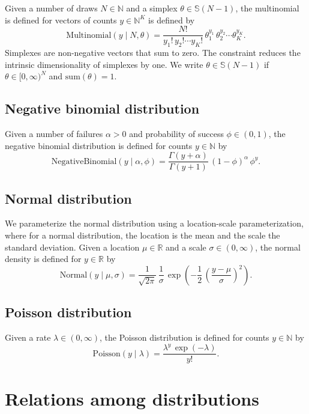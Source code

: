 \documentclass[11pt]{report}
\begin{document}
Given a number of draws $N \in \mathbb{N}$ and a simplex
$\theta \in \mathbb{S}(N-1)$, the multinomial is defined for vectors
of counts $y \in \mathbb{N}^K$ is defined by
%
\[
  \textrm{Multinomial}(y \mid N, \theta)
  = \frac{N!}{y_1! \, y_2! \cdots y_K!} \, \theta_1^{y_1} \, \theta_2^{y_2} \cdots \theta_K^{y_K}.
\]
Simplexes are non-negative vectors that sum to zero.  The constraint
reduces the intrinsic dimensionality of simplexes by one.  We
write
$\theta \in \mathbb{S}(N - 1)$ if $\theta \in [0, \infty)^N$
and $\textrm{sum}(\theta) = 1$.

\section{Negative binomial distribution}

Given a number of failures $\alpha > 0$ and probability of success
$\phi \in (0, 1)$, the negative binomial distribution is defined for
counts $y \in \mathbb{N}$ by
\[
  \textrm{NegativeBinomial}(y \mid \alpha, \phi)
  = \frac{\Gamma(y + \alpha)}{\Gamma(y + 1)}
  \, (1 - \phi)^\alpha
  \, \phi^y.
\]


\section{Normal distribution}

We parameterize the normal distribution using a location-scale
parameterization, where for a normal distribution, the location is the
mean and the scale the standard deviation.  Given a location $\mu \in
\mathbb{R}$ and a scale $\sigma \in (0, \infty)$, the normal density
is defined for $y \in \mathbb{R}$ by
\[
  \textrm{Normal}(y \mid \mu, \sigma)
  = \frac{1}{\sqrt{2\pi}}
  \, \frac{1}{\sigma}
  \, \exp\!\left( -\frac{1}{2} \, \left( \frac{y - \mu}{\sigma}
                                  \right)^2
           \right).
\]

\section{Poisson distribution}

Given a rate $\lambda \in (0, \infty)$, the Poisson distribution is
defined for counts $y \in \mathbb{N}$ by
\[
  \textrm{Poisson}(y \mid \lambda)
  = \frac{\lambda^y \, \exp(-\lambda)}{y!}.
\]



\chapter{Relations among distributions}
\end{document}
